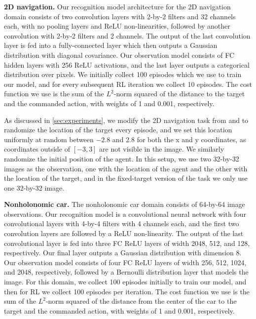 {\bf 2D navigation.} Our recognition model architecture for the 2D navigation domain consists of two convolution layers with \mbox{2-by-2} filters and 32 channels each, with no pooling layers and ReLU non-linearities, followed by another convolution with \mbox{2-by-2} filters and 2 channels. The output of the last convolution layer is fed into a fully-connected layer which then outputs a Gaussian distribution with diagonal covariance. Our observation model consists of FC hidden layers with 256 ReLU activations, and the last layer outputs a categorical distribution over pixels. We initially collect 100 episodes which we use to train our model, and for every subsequent RL iteration we collect 10 episodes. The cost function we use is the sum of the $L^2$-norm squared of the distance to the target and the commanded action, with weights of 1 and 0.001, respectively.

As discussed in \autoref{sec:experiments}, we modify the 2D navigation task from \citet{e2c} and \citet{rce} to randomize the location of the target every episode, and we set this location uniformly at random between $-2.8$ and $2.8$ for both the x and y coordinates, as coordinates outside of $[-3,3]$ are not visible in the image. We similarly randomize the initial position of the agent. In this setup, we use two \mbox{32-by-32} images as the observation, one with the location of the agent and the other with the location of the target, and in the fixed-target version of the task we only use one \mbox{32-by-32} image.

{\bf Nonholonomic car.} The nonholonomic car domain consists of \mbox{64-by-64} image observations. Our recognition model is a convolutional neural network with four convolutional layers with \mbox{4-by-4} filters with 4 channels each, and the first two convolution layers are followed by a ReLU non-linearity. The output of the last convolutional layer is fed into three FC ReLU layers of width 2048, 512, and 128, respectively. Our final layer outputs a Gaussian distribution with dimension 8. Our observation model consists of four FC ReLU layers of width 256, 512, 1024, and 2048, respectively, followed by a Bernoulli distribution layer that models the image. For this domain, we collect 100 episodes initially to train our model, and then for RL we collect 100 episodes per iteration. The cost function we use is the sum of the $L^2$-norm squared of the distance from the center of the car to the target and the commanded action, with weights of 1 and 0.001, respectively.

